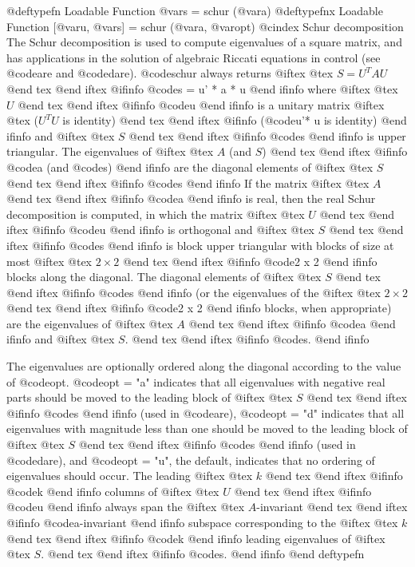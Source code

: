 @deftypefn {Loadable Function} {@var{s} =} schur (@var{a})
@deftypefnx {Loadable Function} {[@var{u}, @var{s}] =} schur (@var{a}, @var{opt})
@cindex Schur decomposition
The Schur decomposition is used to compute eigenvalues of a
square matrix, and has applications in the solution of algebraic
Riccati equations in control (see @code{are} and @code{dare}).
@code{schur} always returns
@iftex
@tex
$S = U^T A U$
@end tex
@end iftex
@ifinfo
@code{s = u' * a * u}
@end ifinfo
where
@iftex
@tex
$U$
@end tex
@end iftex
@ifinfo
@code{u}
@end ifinfo
 is a unitary matrix
@iftex
@tex
($U^T U$ is identity)
@end tex
@end iftex
@ifinfo
(@code{u'* u} is identity)
@end ifinfo
and
@iftex
@tex
$S$
@end tex
@end iftex
@ifinfo
@code{s}
@end ifinfo
is upper triangular.  The eigenvalues of
@iftex
@tex
$A$ (and $S$)
@end tex
@end iftex
@ifinfo
@code{a} (and @code{s})
@end ifinfo
are the diagonal elements of
@iftex
@tex
$S$
@end tex
@end iftex
@ifinfo
@code{s}
@end ifinfo
If the matrix
@iftex
@tex
$A$
@end tex
@end iftex
@ifinfo
@code{a}
@end ifinfo
is real, then the real Schur decomposition is computed, in which the
matrix
@iftex
@tex
$U$
@end tex
@end iftex
@ifinfo
@code{u}
@end ifinfo
is orthogonal and
@iftex
@tex
$S$
@end tex
@end iftex
@ifinfo
@code{s}
@end ifinfo
is block upper triangular
with blocks of size at most
@iftex
@tex
$2\times 2$
@end tex
@end iftex
@ifinfo
@code{2 x 2}
@end ifinfo
blocks along the diagonal.  The diagonal elements of
@iftex
@tex
$S$
@end tex
@end iftex
@ifinfo
@code{s}
@end ifinfo
(or the eigenvalues of the
@iftex
@tex
$2\times 2$
@end tex
@end iftex
@ifinfo
@code{2 x 2}
@end ifinfo
blocks, when
appropriate) are the eigenvalues of
@iftex
@tex
$A$
@end tex
@end iftex
@ifinfo
@code{a}
@end ifinfo
and
@iftex
@tex
$S$.
@end tex
@end iftex
@ifinfo
@code{s}.
@end ifinfo

The eigenvalues are optionally ordered along the diagonal according to
the value of @code{opt}.  @code{opt = "a"} indicates that all
eigenvalues with negative real parts should be moved to the leading
block of
@iftex
@tex
$S$
@end tex
@end iftex
@ifinfo
@code{s}
@end ifinfo
(used in @code{are}), @code{opt = "d"} indicates that all eigenvalues
with magnitude less than one should be moved to the leading block of
@iftex
@tex
$S$
@end tex
@end iftex
@ifinfo
@code{s}
@end ifinfo
(used in @code{dare}), and @code{opt = "u"}, the default, indicates that
no ordering of eigenvalues should occur.  The leading
@iftex
@tex
$k$
@end tex
@end iftex
@ifinfo
@code{k}
@end ifinfo
columns of
@iftex
@tex
$U$
@end tex
@end iftex
@ifinfo
@code{u}
@end ifinfo
always span the
@iftex
@tex
$A$-invariant
@end tex
@end iftex
@ifinfo
@code{a}-invariant
@end ifinfo
subspace corresponding to the
@iftex
@tex
$k$
@end tex
@end iftex
@ifinfo
@code{k}
@end ifinfo
leading eigenvalues of
@iftex
@tex
$S$.
@end tex
@end iftex
@ifinfo
@code{s}.
@end ifinfo
@end deftypefn

